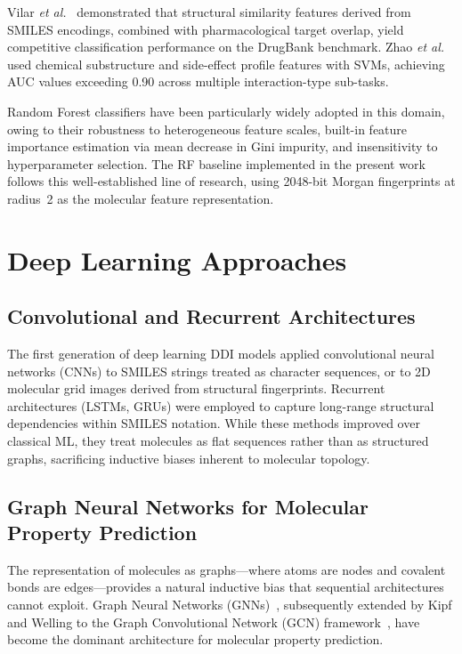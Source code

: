 \documentclass[12pt,a4paper,oneside]{report}
\begin{document}
Vilar \textit{et al.}~\cite{vilar2012detection} demonstrated that structural similarity
features derived from SMILES encodings, combined with pharmacological target overlap, yield
competitive classification performance on the DrugBank benchmark. Zhao \textit{et
al.}~\cite{zhao2011drug} used chemical substructure and side-effect profile features with
SVMs, achieving AUC values exceeding 0.90 across multiple interaction-type sub-tasks.

Random Forest classifiers have been particularly widely adopted in this domain, owing to
their robustness to heterogeneous feature scales, built-in feature importance estimation via
mean decrease in Gini impurity, and insensitivity to hyperparameter selection. The RF
baseline implemented in the present work follows this well-established line of research,
using 2048-bit Morgan fingerprints at radius~2 as the molecular feature representation.

\section{Deep Learning Approaches}

\subsection{Convolutional and Recurrent Architectures}

The first generation of deep learning DDI models applied convolutional neural networks (CNNs)
to SMILES strings treated as character sequences, or to 2D molecular grid images derived from
structural fingerprints. Recurrent architectures (LSTMs, GRUs) were employed to capture
long-range structural dependencies within SMILES notation. While these methods improved over
classical ML, they treat molecules as flat sequences rather than as structured graphs,
sacrificing inductive biases inherent to molecular topology.

\subsection{Graph Neural Networks for Molecular Property Prediction}

The representation of molecules as graphs---where atoms are nodes and covalent bonds are
edges---provides a natural inductive bias that sequential architectures cannot exploit. Graph
Neural Networks (GNNs)~\cite{gori2005new}, subsequently extended by Kipf and Welling to the
Graph Convolutional Network (GCN) framework~\cite{kipf2016semi}, have become the dominant
architecture for molecular property prediction.
\end{document}
